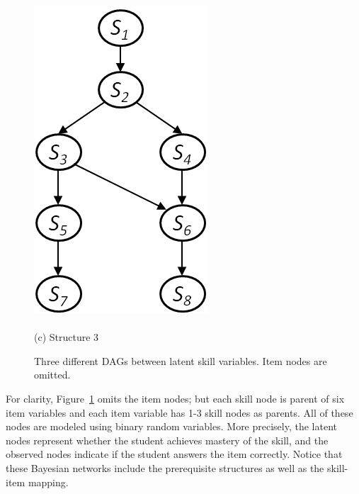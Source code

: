 \documentclass{edm_template}
\begin{document}
{\begin{figure}[!ht]
\begin{minipage}[b]{0.45\linewidth}
			\includegraphics[width=0.7\linewidth]{figures/model3.png}\\~\\
			(c) Structure 3
		\end{minipage}	
		\caption{Three different DAGs between latent skill variables.  Item nodes are omitted.}
		\label{fig:syn-nets}
	\end{figure} 
	
	For clarity, Figure~\ref{fig:syn-nets}  omits the item nodes;
	but each skill node is parent of six item variables and each item variable has 1-3 skill nodes as parents.
	All of these nodes are modeled using binary random variables.
	More precisely, the latent  nodes represent whether the student  achieves mastery of the skill,
	and the observed nodes indicate if the student answers the item correctly.
	Notice that these Bayesian networks include the prerequisite structures as well as the skill-item mapping.
	
}
\end{document}
